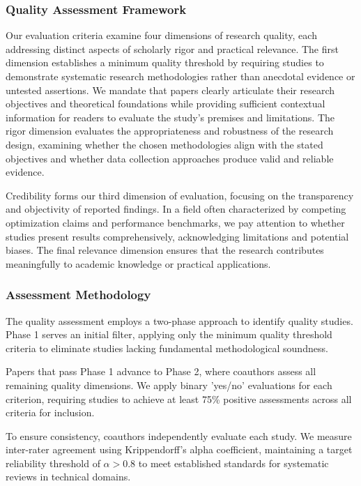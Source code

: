 \documentclass[acmsmall]{acmart}
\begin{document}
\subsubsection{Quality Assessment Framework}\label{subsubsec:phase-3-quality-assessment:quality-assessment-framework}
Our evaluation criteria examine four dimensions of research quality, each addressing distinct aspects of scholarly rigor and practical relevance. The first dimension establishes a minimum quality threshold by requiring studies to demonstrate systematic research methodologies rather than anecdotal evidence or untested assertions. We mandate that papers clearly articulate their research objectives and theoretical foundations while providing sufficient contextual information for readers to evaluate the study's premises and limitations.
The rigor dimension evaluates the appropriateness and robustness of the research design, examining whether the chosen methodologies align with the stated objectives and whether data collection approaches produce valid and reliable evidence.

Credibility forms our third dimension of evaluation, focusing on the transparency and objectivity of reported findings. In a field often characterized by competing optimization claims and performance benchmarks, we pay attention to whether studies present results comprehensively, acknowledging limitations and potential biases. The final relevance dimension ensures that the research contributes meaningfully to academic knowledge or practical applications.

\subsubsection{Assessment Methodology}\label{subsubsec:phase-3-quality-assessment:assessment-methodology}
The quality assessment employs a two-phase approach to  identify quality studies. Phase 1 serves an initial filter, applying only the minimum quality threshold criteria to  eliminate studies lacking fundamental methodological soundness.

Papers that pass Phase 1 advance to Phase 2, where coauthors assess all remaining quality dimensions. We apply binary 'yes/no' evaluations for each criterion, requiring studies to achieve at least 75\% positive assessments across all criteria for inclusion.

To ensure consistency, coauthors independently evaluate each study. We measure inter-rater agreement using Krippendorff's alpha coefficient, maintaining a target reliability threshold of $\alpha > 0.8$ to meet established standards for systematic reviews in technical domains.
\end{document}
